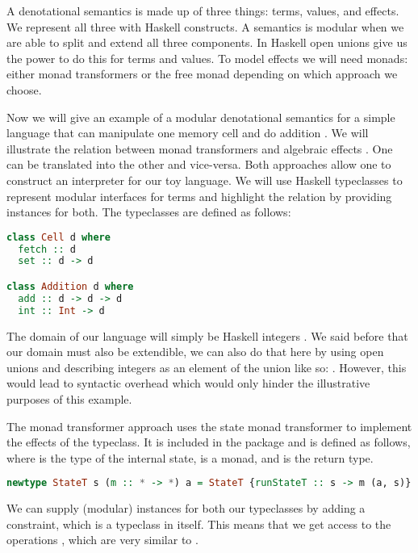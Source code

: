 A denotational semantics is made up of three things: terms, values, and effects. We represent all three with Haskell constructs. A semantics is modular when we are able to split and extend all three components. In Haskell open unions give us the power to do this for terms and values. To model effects we will need monads: either monad transformers or the free monad depending on which approach we choose.

Now we will give an example of a modular denotational semantics for a simple language that can manipulate one memory cell  and do addition . We will illustrate the relation between monad transformers and algebraic effects \cite{DBLP:conf/haskell/SchrijversPWJ19}. One can be translated into the other and vice-versa. Both approaches allow one to construct an interpreter for our toy language. We will use Haskell typeclasses to represent modular interfaces for terms and highlight the relation by providing instances for both. The typeclasses are defined as follows:

\begin{lstlisting}[language=Haskell]
class Cell d where
  fetch :: d
  set :: d -> d

class Addition d where
  add :: d -> d -> d
  int :: Int -> d
\end{lstlisting}

The domain of our language will simply be Haskell integers . We said before that our domain must also be extendible, we can also do that here by using open unions and describing integers as an element of the union like so: . However, this would lead to syntactic overhead which would only hinder the illustrative purposes of this example.

The monad transformer approach uses the state monad transformer to implement the effects of the  typeclass. It is included in the  package and is defined as follows, where  is the type of the internal state,  is a monad, and  is the return type.

\begin{lstlisting}[language=Haskell]
newtype StateT s (m :: * -> *) a = StateT {runStateT :: s -> m (a, s)}
\end{lstlisting}

We can supply (modular) instances for both our typeclasses by adding a  constraint, which is a typeclass in itself. This means that we get access to the operations , which are very similar to .

